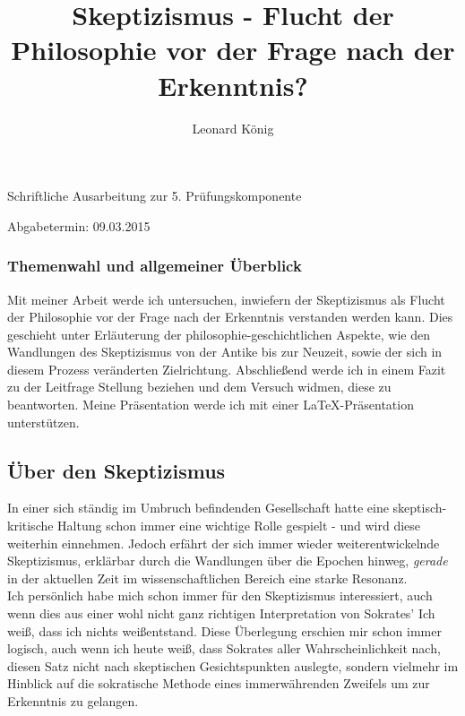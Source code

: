 \documentclass[12pt,a4paper,final]{article}
\title{Skeptizismus - Flucht der Philosophie vor der Frage nach der Erkenntnis?}
\author{Leonard König}
\begin{document}
%
\maketitle
\begin{Large}
\begin{center}
Schriftliche Ausarbeitung zur 5. Prüfungskomponente
\end{center}
\end{Large}
\vspace{100pt}
\begin{Large}
\begin{center}
Abgabetermin: 09.03.2015
\end{center}
\end{Large}
\pagebreak
%
\setcounter{page}{2}
%
%
%
\subsubsection*{Themenwahl und allgemeiner Überblick}
Mit meiner Arbeit werde ich untersuchen, inwiefern der Skeptizismus als Flucht der Philosophie vor der Frage nach der Erkenntnis verstanden werden kann. Dies geschieht unter Erläuterung der philosophie-geschichtlichen Aspekte, wie den Wandlungen des Skeptizismus von der Antike bis zur Neuzeit, sowie der sich in diesem Prozess veränderten Zielrichtung. Abschließend werde ich in einem Fazit zu der Leitfrage Stellung beziehen und dem Versuch widmen, diese zu beantworten. Meine Präsentation werde ich mit einer %
 \LaTeX -Präsentation unterstützen.
\subsection*{Über den Skeptizismus}
In einer sich ständig im Umbruch befindenden Gesellschaft hatte eine skeptisch-kritische Haltung schon immer eine wichtige Rolle gespielt - und wird diese weiterhin einnehmen. Jedoch erfährt der sich immer wieder weiterentwickelnde Skeptizismus, erklärbar durch die Wandlungen über die Epochen hinweg, \emph{gerade} in der aktuellen Zeit im wissenschaftlichen Bereich eine starke Resonanz.\\ %

Ich persönlich habe mich schon immer für den Skeptizismus interessiert, auch wenn dies aus einer wohl nicht ganz richtigen Interpretation von Sokrates' \glqq Ich weiß, dass ich nichts weiß\grqq entstand. Diese Überlegung erschien mir schon immer logisch, auch wenn ich heute weiß, dass Sokrates aller Wahrscheinlichkeit nach, diesen Satz nicht nach skeptischen Gesichtspunkten auslegte, sondern vielmehr im Hinblick auf die sokratische Methode eines immerwährenden Zweifels um zur Erkenntnis zu gelangen.\\
\end{document}
